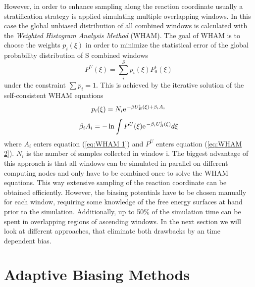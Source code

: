 However, in order to enhance sampling along the reaction coordinate usually a stratification strategy is applied simulating multiple overlapping windows. In this case the global unbiased distribution of all combined windows is calculated with the \textit{Weighted Histogram Analysis Method} (WHAM).\autocite{kumar1992weighted} The goal of WHAM is to choose the weights $p_i(\xi)$ in order to minimize the statistical error of the global probability distribution of S combined windows
\begin{equation}
  P^U(\xi)=\sum_i^{S} p_i(\xi)P_0^i(\xi)
\end{equation}
under the constraint $\sum p_i = 1$. This is achieved by the iterative solution of the self-consistent WHAM equations
\begin{equation}
  p_i(\xi) = N_i \e^{-\beta U_B^i(\xi)+ \beta_i A_i} \label{eq:WHAM 1}
\end{equation}
\begin{equation}
  \beta_i A_i = -\ln \int P^U(\xi)\e^{-\beta_i U_B^i (\xi)}d\xi
  \label{eq:WHAM 2}
\end{equation}
where $A_i$ enters equation (\ref{eq:WHAM 1}) and $P^U$ enters equation (\ref{eq:WHAM 2}). $N_i$ is the number of samples collected in window i.
The biggest advantage of this approach is that all windows can be simulated in parallel on different computing nodes and only have to be combined once to solve the WHAM equations. This way extensive sampling of the reaction coordinate can be obtained efficiently.
However, the biasing potentials have to be chosen manually for each window, requiring some knowledge of the free energy surfaces at hand prior to the simulation.
Additionally, up to 50\% of the simulation time can be spent in overlapping regions of ascending windows.\autocite{comer2015adaptive}
In the next section we will look at different approaches, that eliminate both drawbacks by an time dependent bias.


\newpage
\section{Adaptive Biasing Methods}
\label{sec:adaptive biasing}

